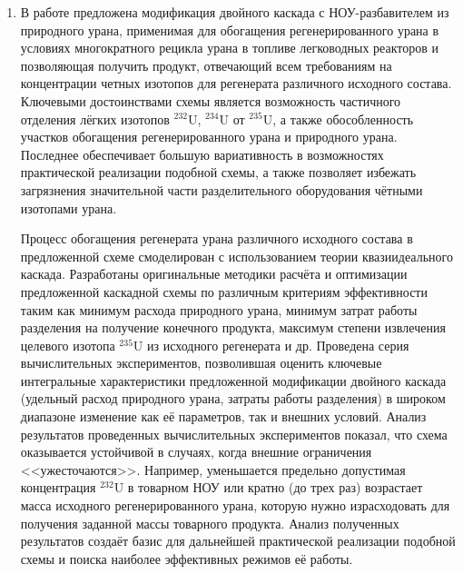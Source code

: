 \begin{enumerate}

  \item В работе предложена модификация двойного каскада с НОУ-разбавителем из природного урана, применимая для обогащения регенерированного урана в условиях
многократного рецикла урана в топливе легководных реакторов и позволяющая получить продукт, отвечающий всем требованиям на концентрации четных изотопов для регенерата различного исходного состава. Ключевыми достоинствами схемы является возможность частичного отделения лёгких изотопов $^{232}$U, $^{234}$U от $^{235}$U, а также обособленность участков обогащения регенерированного урана и природного урана. Последнее обеспечивает большую вариативность в возможностях практической реализации подобной схемы, а также позволяет избежать загрязнения значительной части разделительного оборудования чётными изотопами урана. 

Процесс обогащения регенерата урана различного исходного состава в предложенной схеме смоделирован с использованием теории квазиидеального каскада. Разработаны оригинальные методики расчёта и оптимизации предложенной каскадной схемы по различным критериям эффективности таким как минимум расхода природного урана, минимум затрат работы разделения на получение конечного продукта, максимум степени извлечения целевого изотопа $^{235}$U из исходного регенерата и др. Проведена серия вычислительных экспериментов, позволившая оценить ключевые интегральные характеристики предложенной модификации двойного каскада (удельный расход природного урана, затраты работы разделения) в широком диапазоне изменение как её параметров, так и внешних условий. Анализ результатов проведенных вычислительных экспериментов показал, что схема оказывается устойчивой в случаях, когда внешние ограничения <<ужесточаются>>. Например, уменьшается предельно допустимая концентрация $^{232}$U в товарном НОУ или кратно (до трех раз) возрастает масса исходного регенерированного урана, которую нужно израсходовать для получения заданной массы товарного продукта. Анализ полученных результатов создаёт базис для дальнейшей практической реализации подобной схемы и поиска наиболее эффективных режимов её работы.


\end{enumerate}

